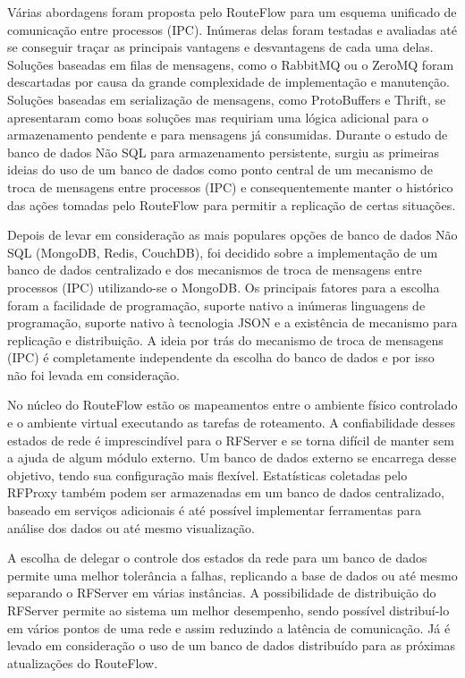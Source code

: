 Várias abordagens foram proposta pelo RouteFlow para um
esquema unificado de comunicação entre processos (IPC). 
Inúmeras delas foram testadas e avaliadas até se conseguir 
traçar as principais vantagens e desvantagens de cada uma delas.
Soluções baseadas em filas de mensagens, como o RabbitMQ
ou o ZeroMQ foram descartadas por causa da grande complexidade
de implementação e manutenção. Soluções baseadas em serialização
de mensagens, como ProtoBuffers e Thrift, se apresentaram como
boas soluções mas requiriam uma lógica adicional para o armazenamento
pendente e para mensagens já consumidas. Durante o estudo
de banco de dados Não SQL para armazenamento persistente,
surgiu as primeiras ideias do uso de um banco de dados como
ponto central de um mecanismo de troca de mensagens entre 
processos (IPC) e consequentemente manter o histórico das 
ações tomadas pelo RouteFlow para permitir a replicação de certas
situações.

Depois de levar em consideração as mais populares opções de 
banco de dados Não SQL (MongoDB, Redis, CouchDB), foi 
decidido sobre a implementação de um banco de dados centralizado
e dos mecanismos de troca de mensagens entre processos (IPC) 
utilizando-se o MongoDB. Os principais fatores para a escolha foram
a facilidade de programação, suporte nativo a inúmeras linguagens de 
programação, suporte nativo à tecnologia JSON e a existência de 
mecanismo para replicação e distribuição. A ideia por trás do
mecanismo de troca de mensagens (IPC) é completamente
independente da escolha do banco de dados e por isso não 
foi levada em consideração.

No núcleo do RouteFlow estão os mapeamentos entre o ambiente
físico controlado e o ambiente virtual executando as tarefas de
roteamento. A confiabilidade desses estados de rede é imprescindível 
para o RFServer e se torna difícil de manter sem a ajuda de 
algum módulo externo. Um banco de dados externo se encarrega
desse objetivo, tendo sua configuração mais flexível. Estatísticas
coletadas pelo RFProxy também podem ser armazenadas em 
um banco de dados centralizado, baseado em serviços adicionais
é até possível implementar ferramentas para análise dos dados 
ou até mesmo visualização.

A escolha de delegar o controle dos estados da rede para um
banco de dados permite uma melhor tolerância a falhas, replicando
a base de dados ou até mesmo separando o RFServer em várias
instâncias. A possibilidade de distribuição do RFServer permite
ao sistema um melhor desempenho, sendo possível distribuí-lo
em vários pontos de uma rede e assim reduzindo a latência de
comunicação. Já é levado em consideração o uso de um banco de
dados distribuído para as próximas atualizações do RouteFlow.









